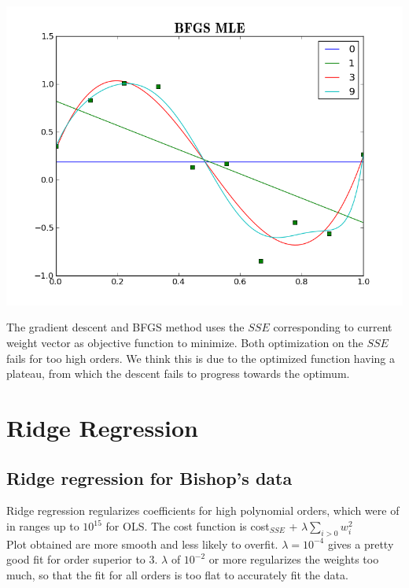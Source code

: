 \documentclass[twoside]{article}
\begin{document}
\includegraphics[scale=0.17]{./img/pol_bfgs_fit.png}
\endgroup

The gradient descent and BFGS method uses the $SSE$ corresponding to current weight vector as objective function to minimize. Both optimization on the $SSE$ fails for too high orders. We think this is due to the optimized function having a plateau, from which the descent fails to progress towards the optimum.


\section{Ridge Regression}

\subsection{Ridge regression for Bishop's data}

Ridge regression regularizes coefficients for high polynomial orders, which were of in ranges up to $10^{15}$ for OLS. The cost function is cost$_{SSE}$ + $\lambda \sum_{i>0}w_i^2$\\
Plot obtained are more smooth and less likely to overfit. $\lambda=10^{-4}$ gives a pretty good fit for order superior to 3. $\lambda$ of $10^{-2}$ or more regularizes the weights too much, so that the fit for all orders is too flat to accurately fit the data.
\end{document}
